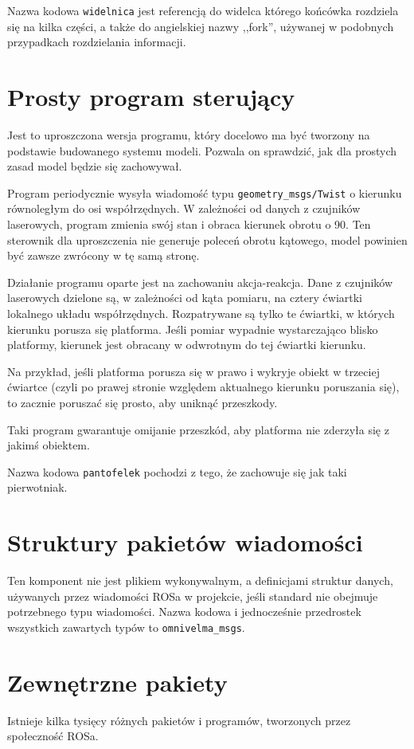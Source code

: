 	Nazwa kodowa \texttt{widelnica} jest referencją do widelca którego końcówka rozdziela się na kilka części, a także do angielskiej nazwy ,,fork'', używanej w podobnych 
	przypadkach rozdzielania informacji.
	
\section{Prosty program sterujący}
	Jest to uproszczona wersja programu, który docelowo ma być tworzony na podstawie budowanego systemu modeli.
	Pozwala on sprawdzić, jak dla prostych zasad model będzie się zachowywał.
	
	Program periodycznie wysyła wiadomość typu \texttt{geometry\_msgs/Twist} o kierunku równoległym do osi współrzędnych.
	W zależności od danych z czujników laserowych, program zmienia swój stan i obraca kierunek obrotu o 90\textdegree.
	Ten sterownik dla uproszczenia nie generuje poleceń obrotu kątowego, model powinien być zawsze zwrócony w tę samą stronę.
	
	Działanie programu oparte jest na zachowaniu akcja-reakcja.
	Dane z czujników laserowych dzielone są, w zależności od kąta pomiaru, na cztery ćwiartki lokalnego układu współrzędnych.
	Rozpatrywane są tylko te ćwiartki, w których kierunku porusza się platforma.
	Jeśli pomiar wypadnie wystarczająco blisko platformy, kierunek jest obracany w odwrotnym do tej ćwiartki kierunku.
	
	Na przykład, jeśli platforma porusza się w prawo i wykryje obiekt w trzeciej ćwiartce (czyli po prawej stronie względem aktualnego kierunku poruszania się),
	to zacznie poruszać się prosto, aby uniknąć przeszkody.
	
	Taki program gwarantuje omijanie przeszkód, aby platforma nie zderzyła się z jakimś obiektem.
	
	Nazwa kodowa \texttt{pantofelek} pochodzi z tego, że zachowuje się jak taki pierwotniak.
	
\section{Struktury pakietów wiadomości}
	Ten komponent nie jest plikiem wykonywalnym, a definicjami struktur danych, używanych przez wiadomości ROSa w projekcie, jeśli 
	standard nie obejmuje potrzebnego typu wiadomości.
	Nazwa kodowa i jednocześnie przedrostek wszystkich zawartych typów to \texttt{omnivelma\_msgs}.

\section{Zewnętrzne pakiety}
	Istnieje kilka tysięcy różnych pakietów i programów, tworzonych przez społeczność ROSa.
	
